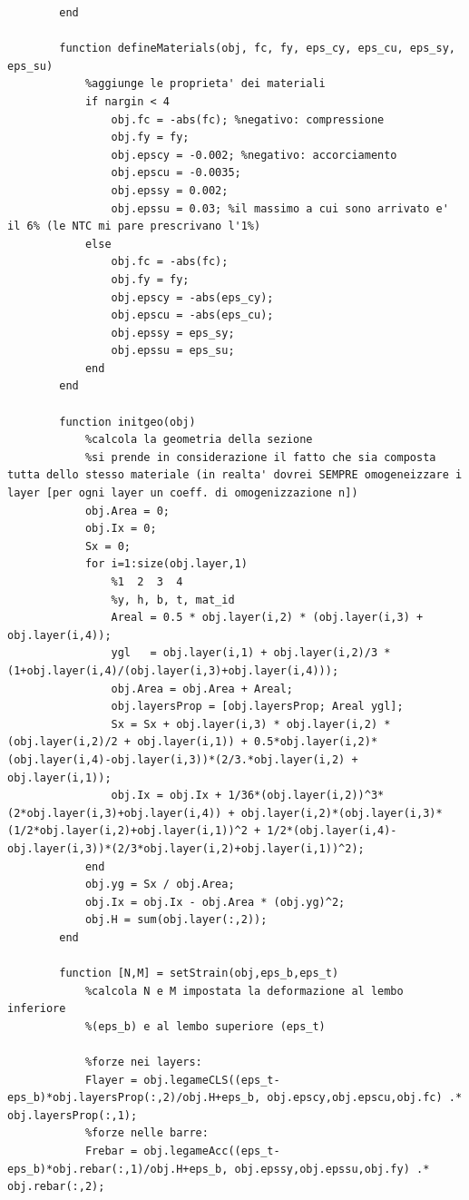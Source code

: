 \documentclass[10pt]{article}
\begin{document}
\begin{lstlisting}
        end
        
        function defineMaterials(obj, fc, fy, eps_cy, eps_cu, eps_sy, eps_su)
            %aggiunge le proprieta' dei materiali
            if nargin < 4
                obj.fc = -abs(fc); %negativo: compressione
                obj.fy = fy;
                obj.epscy = -0.002; %negativo: accorciamento
                obj.epscu = -0.0035;
                obj.epssy = 0.002;
                obj.epssu = 0.03; %il massimo a cui sono arrivato e' il 6% (le NTC mi pare prescrivano l'1%)
            else
                obj.fc = -abs(fc);
                obj.fy = fy;
                obj.epscy = -abs(eps_cy);
                obj.epscu = -abs(eps_cu);
                obj.epssy = eps_sy;
                obj.epssu = eps_su;
            end
        end
        
        function initgeo(obj)
            %calcola la geometria della sezione
            %si prende in considerazione il fatto che sia composta tutta dello stesso materiale (in realta' dovrei SEMPRE omogeneizzare i layer [per ogni layer un coeff. di omogenizzazione n])
            obj.Area = 0;
            obj.Ix = 0;
            Sx = 0;
            for i=1:size(obj.layer,1)
                %1  2  3  4 
                %y, h, b, t, mat_id
                Areal = 0.5 * obj.layer(i,2) * (obj.layer(i,3) + obj.layer(i,4));
                ygl   = obj.layer(i,1) + obj.layer(i,2)/3 * (1+obj.layer(i,4)/(obj.layer(i,3)+obj.layer(i,4)));
                obj.Area = obj.Area + Areal;
                obj.layersProp = [obj.layersProp; Areal ygl];
                Sx = Sx + obj.layer(i,3) * obj.layer(i,2) * (obj.layer(i,2)/2 + obj.layer(i,1)) + 0.5*obj.layer(i,2)*(obj.layer(i,4)-obj.layer(i,3))*(2/3.*obj.layer(i,2) + obj.layer(i,1));
                obj.Ix = obj.Ix + 1/36*(obj.layer(i,2))^3*(2*obj.layer(i,3)+obj.layer(i,4)) + obj.layer(i,2)*(obj.layer(i,3)*(1/2*obj.layer(i,2)+obj.layer(i,1))^2 + 1/2*(obj.layer(i,4)-obj.layer(i,3))*(2/3*obj.layer(i,2)+obj.layer(i,1))^2);
            end
            obj.yg = Sx / obj.Area;
            obj.Ix = obj.Ix - obj.Area * (obj.yg)^2;
            obj.H = sum(obj.layer(:,2));
        end
        
        function [N,M] = setStrain(obj,eps_b,eps_t)
            %calcola N e M impostata la deformazione al lembo inferiore
            %(eps_b) e al lembo superiore (eps_t)
            
            %forze nei layers:
            Flayer = obj.legameCLS((eps_t-eps_b)*obj.layersProp(:,2)/obj.H+eps_b, obj.epscy,obj.epscu,obj.fc) .* obj.layersProp(:,1);
            %forze nelle barre:
            Frebar = obj.legameAcc((eps_t-eps_b)*obj.rebar(:,1)/obj.H+eps_b, obj.epssy,obj.epssu,obj.fy) .* obj.rebar(:,2);
            

\end{lstlisting}
\end{document}
